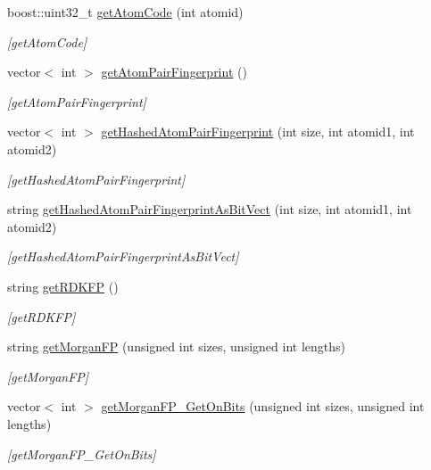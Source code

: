 \begin{DoxyCompactItemize}
boost\+::uint32\+\_\+t \hyperlink{class_molecule_a4123cb22770fc42287562a16affa5ba5}{get\+Atom\+Code} (int atomid)
\begin{DoxyCompactList}\small\item\em \mbox{[}get\+Atom\+Code\mbox{]} \end{DoxyCompactList}\item 
vector$<$ int $>$ \hyperlink{class_molecule_abfb8fda0aff9f7d749257badadd5d6d5}{get\+Atom\+Pair\+Fingerprint} ()
\begin{DoxyCompactList}\small\item\em \mbox{[}get\+Atom\+Pair\+Fingerprint\mbox{]} \end{DoxyCompactList}\item 
vector$<$ int $>$ \hyperlink{class_molecule_a12aeb95c7b163dd74d62cc6973d1197a}{get\+Hashed\+Atom\+Pair\+Fingerprint} (int size, int atomid1, int atomid2)
\begin{DoxyCompactList}\small\item\em \mbox{[}get\+Hashed\+Atom\+Pair\+Fingerprint\mbox{]} \end{DoxyCompactList}\item 
string \hyperlink{class_molecule_abc89b98816f2dc9666679cfb2e1eb696}{get\+Hashed\+Atom\+Pair\+Fingerprint\+As\+Bit\+Vect} (int size, int atomid1, int atomid2)
\begin{DoxyCompactList}\small\item\em \mbox{[}get\+Hashed\+Atom\+Pair\+Fingerprint\+As\+Bit\+Vect\mbox{]} \end{DoxyCompactList}\item 
string \hyperlink{class_molecule_ac60dca92ffb9d756a56b95af1a797022}{get\+R\+D\+K\+F\+P} ()
\begin{DoxyCompactList}\small\item\em \mbox{[}get\+R\+D\+K\+F\+P\mbox{]} \end{DoxyCompactList}\item 
string \hyperlink{class_molecule_a79d09ea8b999fe6ee10efbbdbee2dc54}{get\+Morgan\+F\+P} (unsigned int sizes, unsigned int lengths)
\begin{DoxyCompactList}\small\item\em \mbox{[}get\+Morgan\+F\+P\mbox{]} \end{DoxyCompactList}\item 
vector$<$ int $>$ \hyperlink{class_molecule_a1f719071d2a80ebe43599cd357767a19}{get\+Morgan\+F\+P\+\_\+\+Get\+On\+Bits} (unsigned int sizes, unsigned int lengths)
\begin{DoxyCompactList}\small\item\em \mbox{[}get\+Morgan\+F\+P\+\_\+\+Get\+On\+Bits\mbox{]} \end{DoxyCompactList}\item 

\end{DoxyCompactItemize}
